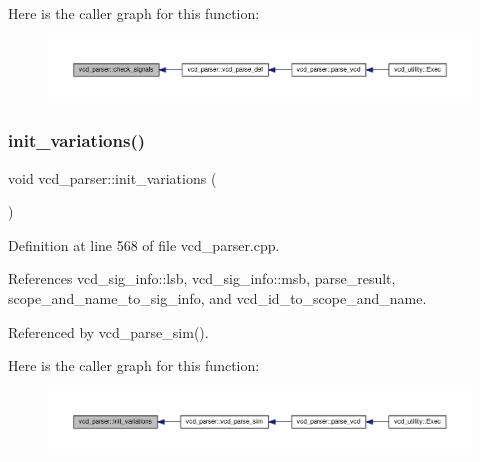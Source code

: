 Here is the caller graph for this function\+:
\nopagebreak
\begin{figure}[H]
\begin{center}
\leavevmode
\includegraphics[width=350pt]{d2/d25/classvcd__parser_a094db21ee543d294fda6891691016dee_icgraph}
\end{center}
\end{figure}
\mbox{\label{classvcd__parser_a249f081203e3ccdb3af66ea16587d30d}} 
\subsubsection{\texorpdfstring{init\+\_\+variations()}{init\_variations()}}
{\footnotesize\ttfamily void vcd\+\_\+parser\+::init\+\_\+variations (\begin{DoxyParamCaption}{ }\end{DoxyParamCaption})\hspace{0.3cm}{\ttfamily [private]}}



Definition at line 568 of file vcd\+\_\+parser.\+cpp.



References vcd\+\_\+sig\+\_\+info\+::lsb, vcd\+\_\+sig\+\_\+info\+::msb, parse\+\_\+result, scope\+\_\+and\+\_\+name\+\_\+to\+\_\+sig\+\_\+info, and vcd\+\_\+id\+\_\+to\+\_\+scope\+\_\+and\+\_\+name.



Referenced by vcd\+\_\+parse\+\_\+sim().

Here is the caller graph for this function\+:
\nopagebreak
\begin{figure}[H]
\begin{center}
\leavevmode
\includegraphics[width=350pt]{d2/d25/classvcd__parser_a249f081203e3ccdb3af66ea16587d30d_icgraph}
\end{center}
\end{figure}
\mbox{\label{classvcd__parser_ad8b4e2abd642bf137a99ea67ea139e95}} 
